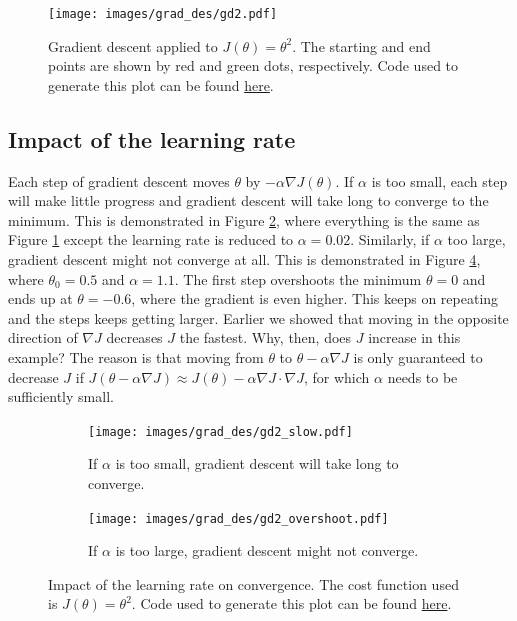 \documentclass{article}
\theoremstyle{definition}
\begin{document}
\begin{figure}[ht]
\centering
\texttt{[image: images/grad\_des/gd2.pdf]}
\caption{Gradient descent applied to $J(\theta)=\theta^2$. The starting and end points are shown by red and green dots, respectively. Code used to generate this plot can be found \href{https://github.com/siavashaslanbeigi/ml_notes/blob/master/src/grad_des/basics.ipynb}{\color{blue} here}.}
\label{graddes-fig:gd2}
\end{figure}


\subsection{Impact of the learning rate}
Each step of gradient descent moves $\theta$ by $-\alpha\nabla J(\theta)$. If $\alpha$ is too small, each step will make little progress and gradient descent will take long to converge to the minimum. This is demonstrated in Figure \ref{graddes-fig:gd2-slow}, where everything is the same as Figure \ref{graddes-fig:gd2} except the learning rate is reduced to $\alpha=0.02$. Similarly, if $\alpha$ too large, gradient descent might not converge at all. This is demonstrated in Figure \ref{graddes-fig:gd2-overshoot}, where $\theta_0=0.5$ and $\alpha = 1.1$. The first step overshoots the minimum $\theta=0$ and ends up at $\theta=-0.6$, where the gradient is even higher. This keeps on repeating and the steps keeps getting larger. Earlier we showed that moving in the opposite direction of $\nabla J$ decreases $J$ the fastest. Why, then, does $J$ increase in this example? The reason is that moving from $\theta$ to $\theta-\alpha\nabla J$ is only guaranteed to decrease $J$ if $J(\theta-\alpha\nabla J) \approx J(\theta) - \alpha\nabla J\cdot \nabla J$, for which $\alpha$ needs to be sufficiently small.

\begin{figure}[ht]
    \begin{subfigure}[ht]{\linewidth}
        \centering
        \texttt{[image: images/grad\_des/gd2\_slow.pdf]}
        \caption{If $\alpha$ is too small, gradient descent will take long to converge.}
        \label{graddes-fig:gd2-slow}
    \end{subfigure}%
    
    \begin{subfigure}[ht]{\linewidth}
        \centering
        \texttt{[image: images/grad\_des/gd2\_overshoot.pdf]}
        \caption{If $\alpha$ is too large, gradient descent might not converge.}
        \label{graddes-fig:gd2-overshoot}
    \end{subfigure}%
    
    \caption{Impact of the learning rate on convergence. The cost function used is $J(\theta)=\theta^2$. Code used to generate this plot can be found \href{https://github.com/siavashaslanbeigi/ml_notes/blob/master/src/grad_des/basics.ipynb}{\color{blue} here}.}
\end{figure}
\end{document}
